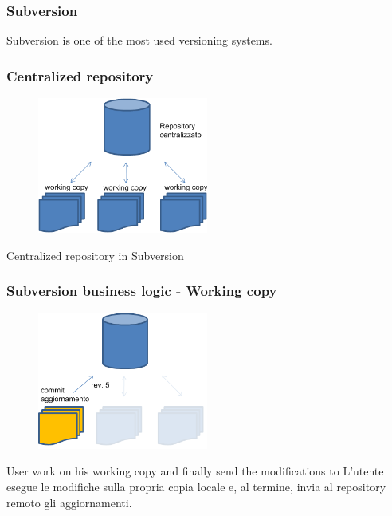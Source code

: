 \documentclass[10pt]{beamer}
\begin{document}
\begin{frame}[fragile]
 \frametitle{Subversion}
Subversion is one of the most used versioning systems.
\end{frame}

\begin{frame}[fragile]
\frametitle{Centralized repository}
\begin{figure}[h]
 \centering
 \includegraphics[width=0.5\textwidth]{images/svn-schema.png}
\end{figure}
Centralized repository in Subversion
\end{frame}
\begin{frame}[fragile]
\frametitle{Subversion business logic - Working copy}
\begin{figure}[h]
 \centering
 \includegraphics[width=0.5\textwidth]{images/svn-step2.png}
\end{figure}
User work on his working copy and finally send the modifications to 
L’utente esegue le modifiche sulla propria copia locale e, al termine, invia al repository remoto gli aggiornamenti.
\end{frame}
\end{document}
